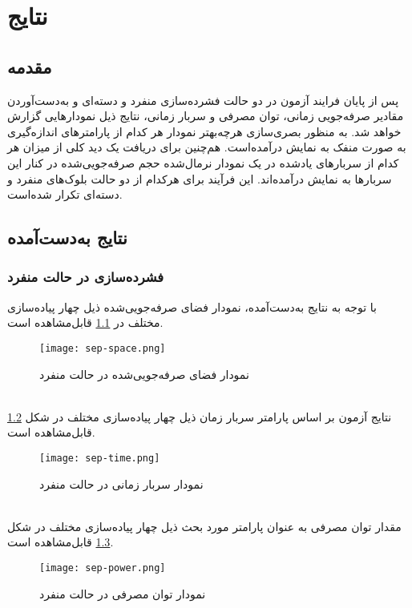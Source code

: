 \chapter{نتایج}
\section{مقدمه} 
پس از پایان فرایند آزمون در دو حالت فشرده‌سازی منفرد و دسته‌ای و به‌دست‌آوردن مقادیر صرفه‌جویی زمانی، توان مصرفی و سربار زمانی، نتایج ذیل نمودارهایی گزارش خواهد شد. به منظور بصری‌سازی هرچه‌بهتر نمودار هر کدام از پارامترهای اندازه‌گیری به صورت منفک به نمایش درآمده‌است. هم‌چنین برای دریافت یک دید کلی از میزان هر کدام از سربارهای یادشده در یک نمودار نرمال‌شده حجم صرفه‌جویی‌شده در کنار این سربارها به نمایش در‌آمده‌اند. این فرآیند برای هرکدام از دو حالت بلوک‌های منفرد و دسته‌ای تکرار شده‌است.

\section{نتایج به‌دست‌آمده}
\subsection{فشرده‌سازی در حالت منفرد}


با توجه به نتایج به‌دست‌آمده، نمودار فضای صرفه‌جویی‌شده ذیل چهار پیاده‌سازی مختلف در
\ref{fig:sep-space}
 قابل‌مشاهده است.
\begin{figure}[ht]
	\centerline{\texttt{[image: sep-space.png]}}
	\caption{ نمودار فضای صرفه‌جویی‌شده در حالت منفرد}
	\label{fig:sep-space}
\end{figure}\\

نتایج آزمون بر اساس پارامتر سربار زمان ذیل چهار پیاده‌سازی مختلف در شکل
\ref{fig:sep-time}
 قابل‌مشاهده است.
\begin{figure}[ht]
	\centerline{\texttt{[image: sep-time.png]}}
	\caption{نمودار سربار زمانی در حالت منفرد}
	\label{fig:sep-time}
\end{figure}\\

مقدار توان مصرفی به عنوان پارامتر مورد بحث ذیل چهار پیاده‌سازی مختلف در شکل
\ref{fig:sep-power}
 قابل‌مشاهده است.
\begin{figure}[ht]
	\centerline{\texttt{[image: sep-power.png]}}
	\caption{نمودار توان مصرفی در حالت منفرد}
	\label{fig:sep-power}
\end{figure}\\

